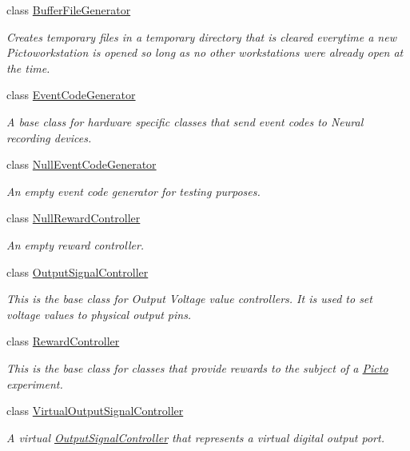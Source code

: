 \begin{DoxyCompactItemize}
class \hyperlink{class_picto_1_1_buffer_file_generator}{Buffer\-File\-Generator}
\begin{DoxyCompactList}\small\item\em Creates temporary files in a temporary directory that is cleared everytime a new Pictoworkstation is opened so long as no other workstations were already open at the time. \end{DoxyCompactList}\item 
class \hyperlink{class_picto_1_1_event_code_generator}{Event\-Code\-Generator}
\begin{DoxyCompactList}\small\item\em A base class for hardware specific classes that send event codes to Neural recording devices. \end{DoxyCompactList}\item 
class \hyperlink{class_picto_1_1_null_event_code_generator}{Null\-Event\-Code\-Generator}
\begin{DoxyCompactList}\small\item\em An empty event code generator for testing purposes. \end{DoxyCompactList}\item 
class \hyperlink{class_picto_1_1_null_reward_controller}{Null\-Reward\-Controller}
\begin{DoxyCompactList}\small\item\em An empty reward controller. \end{DoxyCompactList}\item 
class \hyperlink{class_picto_1_1_output_signal_controller}{Output\-Signal\-Controller}
\begin{DoxyCompactList}\small\item\em This is the base class for Output Voltage value controllers. It is used to set voltage values to physical output pins. \end{DoxyCompactList}\item 
class \hyperlink{class_picto_1_1_reward_controller}{Reward\-Controller}
\begin{DoxyCompactList}\small\item\em This is the base class for classes that provide rewards to the subject of a \hyperlink{namespace_picto}{Picto} experiment. \end{DoxyCompactList}\item 
class \hyperlink{class_picto_1_1_virtual_output_signal_controller}{Virtual\-Output\-Signal\-Controller}
\begin{DoxyCompactList}\small\item\em A virtual \hyperlink{class_picto_1_1_output_signal_controller}{Output\-Signal\-Controller} that represents a virtual digital output port. \end{DoxyCompactList}\item 

\end{DoxyCompactItemize}
